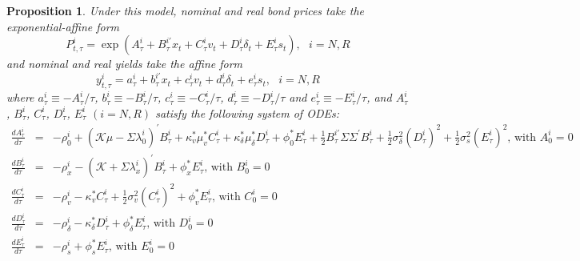 \documentclass{article}
\newtheorem{proposition}[theorem]{Proposition}
\begin{document}
\begin{proposition}
\label{prop_yields}Under this model, nominal and real bond prices take the
exponential-affine form%
\begin{equation}
P_{t,\tau }^{i}=\exp \left( A_{\tau }^{i}+B_{\tau }^{i\prime }x_{t}+C_{\tau
}^{i}v_{t}+D_{\tau }^{i}\delta _{t}+E_{\tau }^{i}s_{t}\right) ,\text{ }i=N,R
\end{equation}%
and nominal and real yields take the affine form%
\begin{equation}
y_{t,\tau }^{i}=a_{\tau }^{i}+b_{\tau }^{i\prime }x_{t}+c_{\tau
}^{i}v_{t}+d_{\tau }^{i}\delta _{t}+e_{\tau }^{i}s_{t},\text{ }i=N,R
\end{equation}%
where $a_{\tau }^{i}\equiv -A_{\tau }^{i}/\tau $, $b_{\tau }^{i}\equiv
-B_{\tau }^{i}/\tau $, $c_{\tau }^{i}\equiv -C_{\tau }^{i}/\tau $, $d_{\tau
}^{i}\equiv -D_{\tau }^{i}/\tau $ and $e_{\tau }^{i}\equiv -E_{\tau
}^{i}/\tau $, and $A_{\tau }^{i}$, $B_{\tau }^{i}$, $C_{\tau }^{i}$, $%
D_{\tau }^{i}$, $E_{\tau }^{i}$ $(i=N,R)$ satisfy the following system of
ODEs:%
\begin{eqnarray*}
\frac{dA_{\tau }^{i}}{d\tau } &=&-\rho _{0}^{i}+\left( \mathcal{K\mu }%
-\Sigma \lambda _{0}^{i}\right) ^{\prime }B_{\tau }^{i}+\kappa _{v}^{\ast
}\mu _{v}^{\ast }C_{\tau }^{i}+\kappa _{\delta }^{\ast }\mu _{\delta }^{\ast
}D_{\tau }^{i}+\phi _{0}^{\ast }E_{\tau }^{i}+\frac{1}{2}B_{\tau }^{i\prime
}\Sigma \Sigma ^{\prime }B_{\tau }^{i}+\frac{1}{2}\sigma _{\delta
}^{2}\left( D_{\tau }^{i}\right) ^{2}+\frac{1}{2}\sigma _{s}^{2}\left(
E_{\tau }^{i}\right) ^{2}\text{, with }A_{0}^{i}=0 \\
\frac{dB_{\tau }^{i}}{d\tau } &=&-\rho _{x}^{i}-\left( \mathcal{K}+\Sigma
\lambda _{x}^{i}\right) ^{\prime }B_{\tau }^{i}+\phi _{x}^{\ast }E_{\tau
}^{i}\text{, with }B_{0}^{i}=0 \\
\frac{dC_{\tau }^{i}}{d\tau } &=&-\rho _{v}^{i}-\kappa _{v}^{\ast }C_{\tau
}^{i}+\frac{1}{2}\sigma _{v}^{2}\left( C_{\tau }^{i}\right) ^{2}+\phi
_{v}^{\ast }E_{\tau }^{i}\text{, with }C_{0}^{i}=0 \\
\frac{dD_{\tau }^{i}}{d\tau } &=&-\rho _{\delta }^{i}-\kappa _{\delta
}^{\ast }D_{\tau }^{i}+\phi _{\delta }^{\ast }E_{\tau }^{i}\text{, with }%
D_{0}^{i}=0 \\
\frac{dE_{\tau }^{i}}{d\tau } &=&-\rho _{s}^{i}+\phi _{s}^{\ast }E_{\tau
}^{i}\text{, with }E_{0}^{i}=0
\end{eqnarray*}
\end{proposition}
\end{document}
